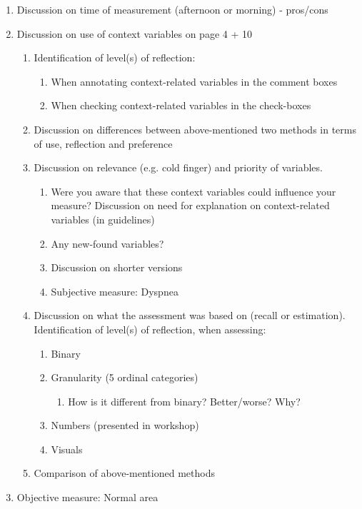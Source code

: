 \begin{enumerate}
\item Discussion on time of measurement (afternoon or morning) - pros/cons
\item Discussion on use of context variables on page 4 + 10
\begin{enumerate}
	\item Identification of level(s) of reflection:
	\begin{enumerate}
		\item When annotating context-related variables in the comment boxes
		\item When checking context-related variables in the check-boxes 
	\end{enumerate}
	\item Discussion on differences between above-mentioned two methods in terms of use, reflection and preference
	\item Discussion on relevance (e.g. cold finger) and priority of variables. 
	\begin{enumerate}
		\item Were you aware that these context variables could influence your measure? Discussion on need for explanation on context-related variables (in guidelines) 
		\item Any new-found variables?
		\item Discussion on shorter versions 
		\item Subjective measure: Dyspnea
	\end{enumerate}
	\item Discussion on what the assessment was based on (recall or estimation). Identification of level(s) of reflection, when assessing:
	\begin{enumerate}
		\item Binary
		\item Granularity (5 ordinal categories)
		\begin{enumerate}
			\item How is it different from binary? Better/worse? Why?
		\end{enumerate}
		\item Numbers (presented in workshop)
		\item Visuals
	\end{enumerate}
	\item Comparison of above-mentioned methods
\end{enumerate}
\item Objective measure: Normal area
\begin{enumerate}

\end{enumerate}
\end{enumerate}
